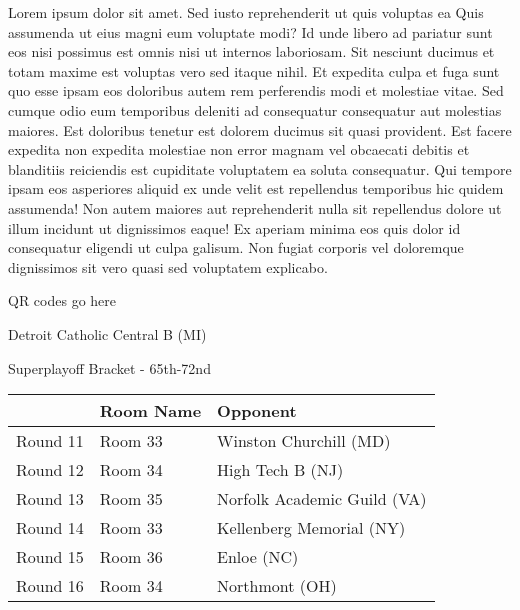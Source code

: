 \documentclass{article}%
\begin{document}
\vspace*{8pt}%
\linebreak%
\newline%
\newline%
    Lorem ipsum dolor sit amet. Sed iusto reprehenderit ut quis voluptas ea Quis assumenda ut eius magni eum voluptate modi? Id unde libero ad pariatur sunt eos nisi possimus est omnis nisi ut internos laboriosam. Sit nesciunt ducimus et totam maxime est voluptas vero sed itaque nihil. Et expedita culpa et fuga sunt quo esse ipsam eos doloribus autem rem perferendis modi et molestiae vitae.\newline%
\newline%
    Sed cumque odio eum temporibus deleniti ad consequatur consequatur aut molestias maiores. Est doloribus tenetur est dolorem ducimus sit quasi provident. Est facere expedita non expedita molestiae non error magnam vel obcaecati debitis et blanditiis reiciendis est cupiditate voluptatem ea soluta consequatur. Qui tempore ipsam eos asperiores aliquid ex unde velit est repellendus temporibus hic quidem assumenda!\newline%
\newline%
    Non autem maiores aut reprehenderit nulla sit repellendus dolore ut illum incidunt ut dignissimos eaque! Ex aperiam minima eos quis dolor id consequatur eligendi ut culpa galisum. Non fugiat corporis vel doloremque dignissimos sit vero quasi sed voluptatem explicabo.\newline%
\newline%
\vspace*{30pt}%
\begin{center}%
\begin{Huge}%
QR codes go here%
\end{Huge}%
\end{center}%
\newpage%
\begin{center}%
\begin{Huge}%
Detroit Catholic Central B (MI)%
\end{Huge}%
\vspace*{8pt}%
\linebreak%
\begin{Large}%
Superplayoff Bracket {-} 65th{-}72nd%
\end{Large}%
\end{center}%
%
\begin{tabularx}{\textwidth}{|c|Y|Y|}%
\hline%
&Room Name&Opponent\\%
\hline%
Round 11&Room 33&Winston Churchill (MD)\\%
Round 12&Room 34&High Tech B (NJ)\\%
Round 13&Room 35&Norfolk Academic Guild (VA)\\%
Round 14&Room 33&Kellenberg Memorial (NY)\\%
Round 15&Room 36&Enloe (NC)\\%
Round 16&Room 34&Northmont (OH)\\%
\hline%
\end{tabularx}%
\end{document}
